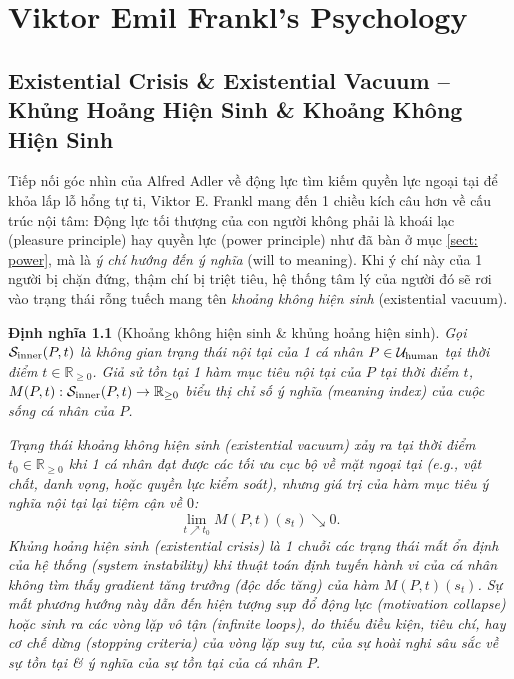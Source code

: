 \documentclass{report}
\newtheorem{dinhnghia}{Định nghĩa}
\begin{document}
\chapter{Viktor Emil Frankl's Psychology}


\section{Existential Crisis \& Existential Vacuum -- Khủng Hoảng Hiện Sinh \& Khoảng Không Hiện Sinh}
\label{sect: existential crisis}
Tiếp nối góc nhìn của {\sc Alfred Adler} về động lực tìm kiếm quyền lực ngoại tại để khỏa lấp lỗ hổng tự ti, {\sc Viktor E. Frankl} mang đến 1 chiều kích câu hơn về cấu trúc nội tâm: Động lực tối thượng của con người không phải là khoái lạc (pleasure principle) hay quyền lực (power principle) như đã bàn ở mục \ref{sect: power}, mà là {\it ý chí hướng đến ý nghĩa} (will to meaning). Khi ý chí này của 1 người bị chặn đứng, thậm chí bị triệt tiêu, hệ thống tâm lý của người đó sẽ rơi vào trạng thái rỗng tuếch mang tên {\it khoảng không hiện sinh} (existential vacuum).

\begin{dinhnghia}[Khoảng không hiện sinh \& khủng hoảng hiện sinh]
	Gọi ${\cal S}_{\rm inner}(P,t)$ là không gian trạng thái nội tại của 1 cá nhân $P\in{\cal U}_{\rm human}$ tại thời điểm $t\in\mathbb{R}_{\ge0}$. Giả sử tồn tại 1 hàm mục tiêu nội tại của $P$ tại thời điểm $t$, $M(P,t):{\cal S}_{\rm inner}(P,t)\to\mathbb{R}_{\ge0}$ biểu thị \emph{chỉ số ý nghĩa (meaning index)} của cuộc sống cá nhân của $P$.
	
	Trạng thái \emph{khoảng không hiện sinh (existential vacuum)} xảy ra tại thời điểm $t_0\in\mathbb{R}_{\ge0}$ khi 1 cá nhân đạt được các tối ưu cục bộ về mặt ngoại tại (e.g., vật chất, danh vọng, hoặc quyền lực kiểm soát), nhưng giá trị của hàm mục tiêu ý nghĩa nội tại lại tiệm cận về $0$:
	\begin{equation*}
		\lim_{t\nearrow t_0} M(P,t)(s_t)\searrow0.
	\end{equation*}
	\emph{Khủng hoảng hiện sinh (existential crisis)} là 1 chuỗi các trạng thái mất ổn định của hệ thống (system instability) khi thuật toán định tuyến hành vi của cá nhân không tìm thấy gradient tăng trưởng (độc dốc tăng) của hàm $M(P,t)(s_t)$. Sự mất phương hướng này dẫn đến hiện tượng sụp đổ động lực (motivation collapse) hoặc sinh ra các vòng lặp vô tận (infinite loops), do thiếu điều kiện, tiêu chí, hay cơ chế dừng (stopping criteria) của vòng lặp suy tư, của sự hoài nghi sâu sắc về sự tồn tại \& ý nghĩa của sự tồn tại của cá nhân $P$.
\end{dinhnghia}
\end{document}
